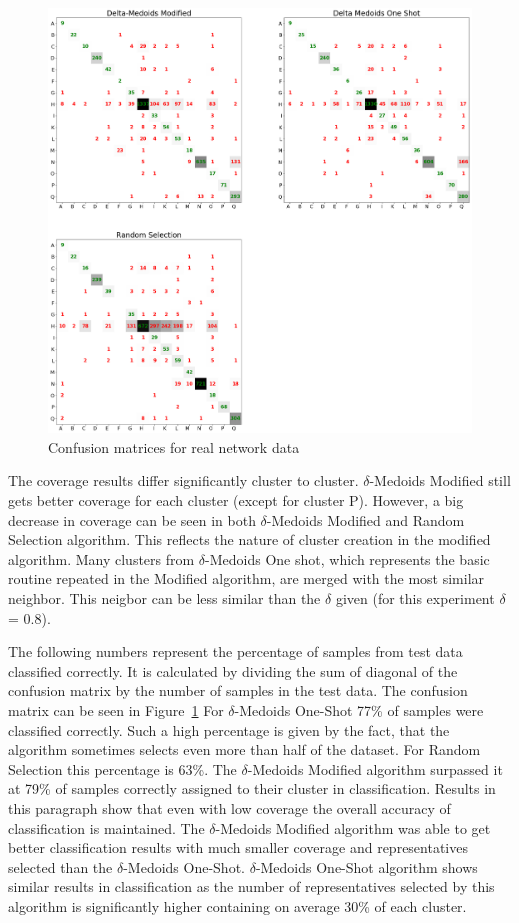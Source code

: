 \documentclass[thesis=B,english]{FITthesis}[2012/10/20]
\begin{document}
\begin{figure}[h]
   \includegraphics[width=\linewidth]{img/exp4.png}
  \caption{Confusion matrices for real network data}
  \label{img:exp4}
\end{figure}

\noindent The coverage results differ significantly cluster to cluster.
$\delta$-Medoids Modified still gets better coverage for each cluster (except for cluster P).
However, a big decrease in coverage can be seen in both $\delta$-Medoids Modified and Random Selection algorithm.
This reflects the nature of cluster creation in the modified algorithm.
Many clusters from $\delta$-Medoids One shot, which represents the basic routine repeated in the Modified algorithm, are merged with the most similar neighbor.
This neigbor can be less similar than the $\delta$ given (for this experiment $\delta$ = 0.8).

The following numbers represent the percentage of samples from test data classified correctly.
It is calculated by dividing the sum of diagonal of the confusion matrix by the number of samples in the test data.
The confusion matrix can be seen in Figure~\ref{img:exp4}
For $\delta$-Medoids One-Shot 77\% of samples were classified correctly.
Such a high percentage is given by the fact, that the algorithm sometimes selects even more than half of the dataset.
For Random Selection this percentage is 63\%.
The $\delta$-Medoids Modified algorithm surpassed it at 79\% of samples correctly assigned to their cluster in classification.
Results in this paragraph show that even with low coverage the overall accuracy of classification is maintained.
The $\delta$-Medoids Modified algorithm was able to get better classification results with much smaller coverage and representatives selected than the $\delta$-Medoids One-Shot.
$\delta$-Medoids One-Shot algorithm shows similar results in classification as the number of representatives selected by this algorithm is significantly higher containing on average 30\% of each cluster.
\end{document}
